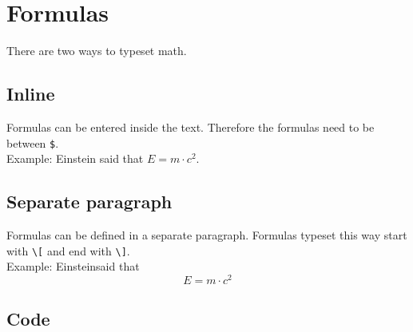 \section{Formulas}
There are two ways to typeset math. 

\subsection{Inline}
Formulas can be entered inside the text. Therefore the formulas need to be 
between \verb!$!. \\
Example: 
Einstein said that $E = m \cdot c^2$. 

\subsection{Separate paragraph}
Formulas can be defined in a separate paragraph. Formulas typeset this way 
start with \verb!\[! and end with \verb!\]!. \\
Example: 
Einsteinsaid that
\[ E = m \cdot c^2 \]

\subsection{Code}

